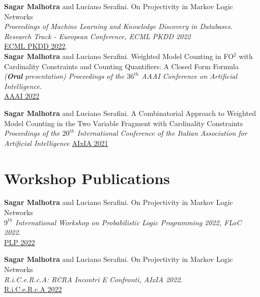 \documentclass[10pt, a4paper]{article}
\newcommand{\years}[1]{\marginnote{\scriptsize #1}}
\begin{document}
\years{2022}\textbf{Sagar Malhotra} and Luciano Serafini. On Projectivity in Markov Logic Networks \\ \emph{Proceedings of Machine Learning and Knowledge Discovery in Databases. Research Track - European Conference, ECML PKDD 2022} \\  
\href{https://link.springer.com/chapter/10.1007/978-3-031-26419-1_14}{ECML PKDD 2022}.\\
\years{2022}\textbf{Sagar Malhotra} and Luciano Serafini. Weighted Model Counting in FO$^2$ with Cardinality Constraints and Counting Quantifiers: A Closed Form Formula \\ \emph{(\textbf{Oral} presentation) Proceedings of the $36^{th}$ AAAI Conference on Artificial Intelligence.}\\
\href{https://ojs.aaai.org/index.php/AAAI/article/view/20525}{AAAI 2022}  

\years{2021}\textbf{Sagar Malhotra} and Luciano Serafini. A Combinatorial Approach to Weighted Model Counting in the Two Variable Fragment with Cardinality Constraints\\ \emph{ Proceedings of the $20^{th}$ International Conference of the Italian Association for Artificial Intelligence}
\href{https://link.springer.com/chapter/10.1007/978-3-031-08421-8_10}{AIxIA 2021} 


\section*{Workshop Publications}
\noindent
\years{2022}\textbf{Sagar Malhotra} and Luciano Serafini. On Projectivity in Markov Logic Networks\\ 
\emph{$9^{th}$ International Workshop on Probabilistic Logic Programming 2022, FLoC 2022.}\\
\href{https://easychair.org/publications/preprint/2lTk}{ PLP 2022}

\years{2022}\textbf{Sagar Malhotra} and Luciano Serafini. On Projectivity in Markov Logic Networks\\ 
\emph{R.i.C.e.R.c.A: RCRA Incontri E Confronti, AIxIA 2022.}\\
\href{https://ricerca2022.wordpress.com}{ R.i.C.e.R.c.A 2022}
\end{document}
